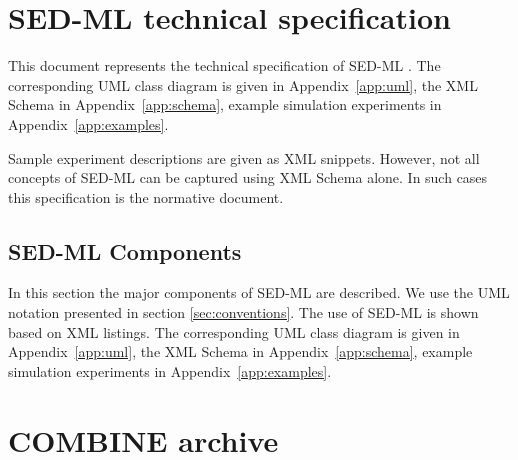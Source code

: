 \documentclass[pdftex,rgb,dvipsnames,svgnames,hyperref,table]{report}
\begin{document}

\tableofcontents
\newpage


\chapter{SED-ML technical specification}
\label{chp:specification}

This document represents the technical specification of SED-ML \currentLV. The corresponding UML class diagram is given in Appendix~\ref{app:uml}, the XML Schema in Appendix~\ref{app:schema}, example simulation experiments in Appendix~\ref{app:examples}.

Sample experiment descriptions are given as XML snippets. However, not all concepts of SED-ML can be captured using XML Schema alone. In such cases this specification is the normative document. 








\section{SED-ML Components}
\label{sec:components}
In this section the major components of SED-ML are described. We use the UML notation presented in section \ref{sec:conventions}. The use of SED-ML is shown based on XML listings. The corresponding UML class diagram is given in Appendix~\ref{app:uml}, the XML Schema in Appendix~\ref{app:schema}, example simulation experiments in Appendix~\ref{app:examples}.









\chapter{COMBINE archive}
\label{chp:archive}
\end{document}
